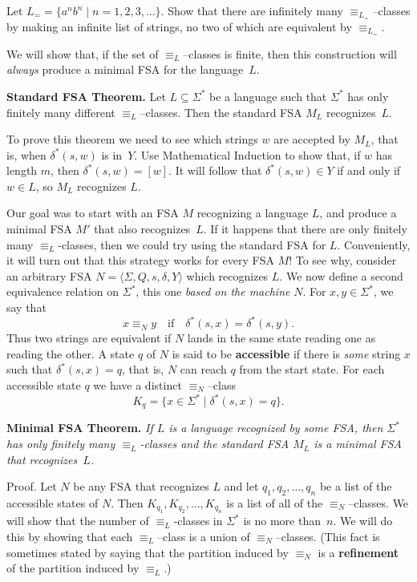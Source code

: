 \begin{prb}
\label{5.3}
Let $L_= =\{a^nb^n \mid n=1,2,3,\dots\}$.  Show that there are infinitely many $\equiv_{L_=}$--classes by making an infinite list of strings, no two of which are equivalent by $\equiv_{L_=}$.
\end{prb}

\nin  We will show that, if the set of $\equiv_L$--classes is finite, then this construction will \emph{always} produce a minimal FSA for the language~$L$.
\medskip

\noindent\textbf{Standard FSA Theorem.}
Let $L\subseteq \Sigma^*$ be a language such that $\Sigma^*$ has only finitely many different $\equiv_L$--classes.  Then the standard FSA $M_L$  recognizes~$L$.\medskip

\begin{prb}
To prove this theorem we need to see which strings $w$ are accepted by $M_L$, that is, when $\delta^*(s,w)$ is in~$Y$.  Use Mathematical Induction to show that, if $w$ has length $m$, then $\delta^*(s,w) = [w]$.  It will follow that $\delta^*(s,w)\in Y$ if and only if $w\in L$, so $M_L$ recognizes $L$.
\end{prb}

Our goal was to start with an FSA $M$ recognizing a language $L$, and produce a minimal FSA $M'$ that also recognizes~$L$.  If it happens that there are only finitely many $\equiv_L$-classes, then we could try using the standard FSA for $L$.  Conveniently, it will turn out that this strategy works for every FSA $M$!   To see why, consider an arbitrary FSA $N = \langle \Sigma, Q,s,\delta,Y \rangle$ which recognizes $L$.  We now define a second equivalence relation on $\Sigma^*$, this one \emph{based on the machine} $N$.  For $x,y\in \Sigma^*$, we say that
\[
x\equiv_{N} y \quad\text{if}\quad \delta^*(s,x)=\delta^*(s,y).
\]
Thus two strings are equivalent if $N$ lands in the same state reading
one as reading the other.  A state $q$ of $N$ is said to be
\textbf{accessible} if there is \emph{some} string $x$ such that
$\delta^*(s,x) = q$, that is, $N$ can reach $q$ from the start state.  For
each accessible state $q$ we have a distinct $\equiv_{N}$--class
\[
K_q = \{x\in \Sigma^* \mid \delta^*(s,x) = q\}.
\]

\noindent\textbf{Minimal FSA Theorem. }  {\sl If\/ $L$ is a language recognized by some FSA,   then $\Sigma^*$ has only finitely many $\equiv_L$-classes and the standard FSA $M_L$ is a minimal FSA that recognizes~$L$.  }
\medskip

\noindent \textsf{Proof.}   Let $N$ be any FSA that recognizes $L$ and let $q_1, q_2,\dots,q_n$ be a list of the accessible states of $N$.  Then $K_{q_1}, K_{q_2},\dots, K_{q_n}$ is a list of all of the $\equiv_{N}$--classes.  We will show that the number of $\equiv_L$-classes in $\Sigma^*$ is no more than~$n$.   We will do this by showing that each $\equiv_{L}$--class is a union of $\equiv_N$--classes.  (This fact is sometimes stated by saying that the partition induced by $\equiv_{N}$ is a \textbf{refinement} of the partition induced by $\equiv_L$.)

